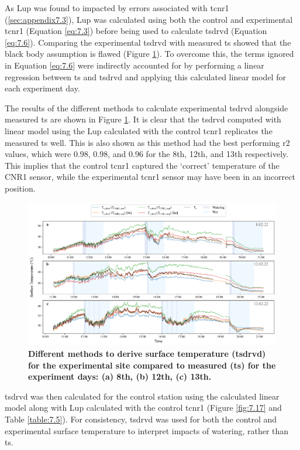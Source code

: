 \documentclass[final,3p,times,authoryear]{elsarticle}
\begin{document}
As \gls{Lup} was found to impacted by errors associated with \gls{tcnr1} (\ref{sec:appendix7.3}), \gls{Lup} was calculated using both the control and experimental \gls{tcnr1} (Equation \ref{eq:7.3}) before being used to calculate \gls{tsdrvd} (Equation \ref{eq:7.6}). Comparing the experimental \gls{tsdrvd} with measured \gls{ts} showed that the black body assumption is flawed (Figure \ref{fig:7.8}). To overcome this, the terms ignored in Equation \ref{eq:7.6} were indirectly accounted for by performing a linear regression between \gls{ts} and \gls{tsdrvd} and applying this calculated linear model for each experiment day.

The results of the different methods to calculate experimental \gls{tsdrvd} alongside measured \gls{ts} are shown in Figure \ref{fig:7.8}. It is clear that the \gls{tsdrvd} computed with linear model using the \gls{Lup} calculated with the control \gls{tcnr1} replicates the measured \gls{ts} well. This is also shown as this method had the best performing \gls{r2} values, which were 0.98, 0.98, and 0.96 for the 8th, 12th, and 13th respectively. This implies that the control \gls{tcnr1} captured the `correct' temperature of the CNR1 sensor, while the experimental \gls{tcnr1} sensor may have been in an incorrect position.


\begin{figure}
\centering
\includegraphics[trim={0 0 0 0},clip,scale=1.0]{pict027.png}
\caption{\bf Different methods to derive surface temperature (\gls{tsdrvd}) for the experimental site compared to measured (\gls{ts}) for the experiment days: (a) 8th, (b) 12th, (c) 13th.}
 \label{fig:7.8}
\end{figure}

\gls{tsdrvd} was then calculated for the control station using the calculated linear model along with \gls{Lup} calculated with the control \gls{tcnr1} (Figure \ref{fig:7.17} and Table \ref{table:7.5}). For consistency, \gls{tsdrvd} was used for both the control and experimental surface temperature to interpret impacts of watering, rather than \gls{ts}.
\end{document}
